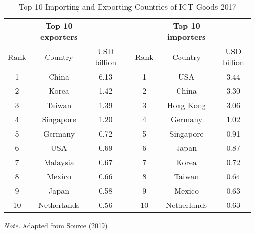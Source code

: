 \documentclass{book}
\begin{document}

\begin{table}

	\caption{Top 10 Importing and Exporting Countries of ICT Goods 2017}
		
	\centering
	
	\begin{tabular}{ccccccc} %

	\toprule
	
			&	\textbf{Top 10 exporters} &			&&			&	\textbf{Top 10 importers} &\\
			
	\cline{1-3} \cline{5-7}
	
	
	Rank	&	Country				&	USD billion	&&	Rank	&	Country				& USD billion \\
	
	\cline{1-3} \cline{5-7}
	
	
	1		&	China				&	6.13		&&	1		&	USA					& 3.44 \\
	2		&	Korea				&	1.42		&&	2		&	China				& 3.30 \\
	3		&	Taiwan				&	1.39		&&	3		&	Hong Kong			& 3.06 \\
	4		&	Singapore			&	1.20		&&	4		&	Germany				& 1.02 \\
	5		&	Germany				&	0.72		&&	5		&	Singapore			& 0.91 \\
	6		&	USA					&	0.69		&&	6		&	Japan				& 0.87 \\
	7		&	Malaysia			&	0.67		&&	7		&	Korea				& 0.72 \\
	8		&	Mexico				&	0.66		&&	8		&	Taiwan				& 0.64 \\
	9		&	Japan				&	0.58		&&	9		&	Mexico				& 0.63 \\
	10		&	Netherlands			&	0.56		&&	10		&	Netherlands			& 0.63 \\
	
	\bottomrule
	
	
	\end{tabular}
	
	\begin{flushleft}
	\textit{Note.} Adapted from Source (2019)
	\end{flushleft}
	
	\label{tab:top10_importers_exporters}
	
\end{table}
\end{document}
